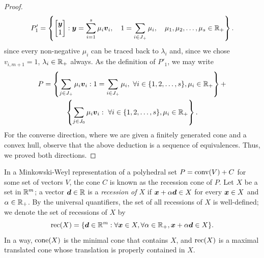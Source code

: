 \begin{proof}
\begin{equation} %
P'_1 = \left\{ \bmat{\bmy \\ 1}: \bmy = \sum_{i=1}^s \mu_i\bmv_i, \quad 1 =  \sum_{i\in J_+} \mu_i, \quad \mu_1, \mu_2, \dots, \mu_s\in\rr_+\right\}. \end{equation}
since every non-negative $\mu_i$ can be traced back to $\lambda_i$ and, since we chose $v_{i, m+1} = 1$, $\lambda_i\in\mathbb R_+$ always. As the definition of $P'_1$, we may write
\begin{multline}\label{eqn: MW construction}
P =\left\{  \sum_{j\in J_+} \mu_i{\boldsymbol v}_i :  1 =  \sum_{i\in J_+} \mu_i,~\forall i\in\{1,2,\dots, s\}, \mu_i \in\mathbb R_+\right\} 
+ \\
\left\{  \sum_{j\in J_0} \mu_i{\boldsymbol v}_i:~ \forall i\in\{1,2,\dots, s\}, \mu_i \in\mathbb R_+\right\}.\end{multline}
For the converse direction, where we are given a finitely generated cone and a convex hull, observe that the above deduction is a sequence of equivalences. Thus, we proved both directions. 
\end{proof}

In a Minkowski-Weyl representation of a polyhedral set $P = \operatorname{conv}(V) + C$ for some set of vectors $V$, the cone $C$ is known as the recession cone of $P$. Let $X$ be a set in $\mathbb R^m$; a vector ${\boldsymbol d}\in\mathbb R$ is a {\em recession of $X$} if ${\boldsymbol x} + \alpha{\boldsymbol d}\in X$ for every ${\boldsymbol x}\in X$ and $\alpha\in\mathbb R_+$. By the universal quantifiers, the set of all recessions of $X$ is well-defined; we denote the set of recessions of $X$ by \[ \operatorname{rec}(X) = \{{\boldsymbol d}\in\mathbb R^m: \forall {\boldsymbol x}\in X,\forall \alpha\in\mathbb R_+, {\boldsymbol x} + \alpha{\boldsymbol d}\in X\}.\] In a way, $\operatorname{cone}(X)$ is the minimal cone that contains $X$, and $\operatorname{rec}(X)$ is a maximal translated cone whose translation is properly contained in $X$. 

